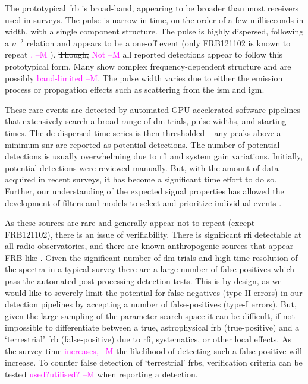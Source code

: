 \documentclass[a4paper,fleqn,usenatbib]{mnras}
\newcommand{\cM}[1]{\textcolor{magenta}{ #1 --M}}
\begin{document}
The prototypical \gls{frb} is broad-band, appearing to be broader than most
receivers used in surveys. The pulse is narrow-in-time, on the order of a few
milliseconds in width, with a single component structure. The pulse is highly
dispersed, following a $\nu^{-2}$ relation and appears to be a one-off event
(only FRB121102 is known to repeat\cM{,} \citealt{2016Natur.531..202S}).  \sout{Though,} \cM{Not}
all reported detections appear to follow this prototypical form. Many show
complex frequency-dependent structure and are possibly \cM{band-limited}. The pulse
width varies due to either the emission process or propagation effects such as
scattering from the \gls{ism} and \gls{igm}.

These rare events are detected by automated GPU-accelerated software pipelines
that extensively search a broad range of \gls{dm} trials, pulse widths, and
starting times.  The de-dispersed time series is then thresholded -- any
peaks above a minimum \gls{snr} are reported as potential detections. The number
of potential detections is usually overwhelming due to \gls{rfi} and system gain
variations. Initially, potential detections were reviewed manually. But, with
the amount of data acquired in recent surveys, it has become a significant time
effort to do so. Further, our understanding of the expected signal properties
has allowed the development of filters and models to select and prioritize
individual events \citep{2018MNRAS.474.3847F}.

As these sources are rare and generally appear not to repeat (except FRB121102),
there is an issue of verifiability. There is significant \gls{rfi} detectable at
all radio observatories, and there are known anthropogenic sources that appear
FRB-like \citep{2011ApJ...727...18B}.  Given the significant number of \gls{dm}
trials and high-time resolution of the spectra in a typical survey there are a
large number of false-positives which pass the automated post-processing
detection tests.  This is by design, as we would like to severely limit the
potential for false-negatives (type-II errors) in our detection pipelines by
accepting a number of false-positives (type-I errors).  But, given the large
sampling of the parameter search space it can be difficult, if not impossible to
differentiate between a true, astrophysical \gls{frb} (true-positive) and a
`terrestrial' \gls{frb} (false-positive) due to \gls{rfi}, systematics, or other
local effects. As the survey time \cM{increases,} the likelihood of detecting such a
false-positive will increase. To counter false detection of `terrestrial'
\glspl{frb}, verification criteria can be tested \cM{used?utilised?} when reporting a detection.
\end{document}
